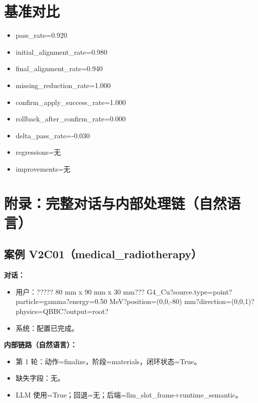 \documentclass[11pt]{ctexart}
\begin{document}
\section{基准对比}
\begin{itemize}
\item pass\_rate=0.920
\item initial\_alignment\_rate=0.980
\item final\_alignment\_rate=0.940
\item missing\_reduction\_rate=1.000
\item confirm\_apply\_success\_rate=1.000
\item rollback\_after\_confirm\_rate=0.000
\item delta\_pass\_rate=-0.030
\item regressions=无
\item improvements=无
\end{itemize}
\appendix
\section{附录：完整对话与内部处理链（自然语言）}
\subsection{案例 V2C01（medical\_radiotherapy）}
\textbf{对话：}
\begin{itemize}
\item 用户：????? 80 mm x 90 mm x 30 mm??? G4\_Cu?source.type=point?particle=gamma?energy=0.50 MeV?position=(0,0,-80) mm?direction=(0,0,1)?physics=QBBC?output=root?
\item 系统：配置已完成。
\end{itemize}
\textbf{内部链路（自然语言）：}
\begin{itemize}
\item 第 1 轮：动作=finalize，阶段=materials，闭环状态=True。
\item 缺失字段：无。
\item LLM 使用=True；回退=无；后端=llm\_slot\_frame+runtime\_semantic。
\end{itemize}
\end{document}
